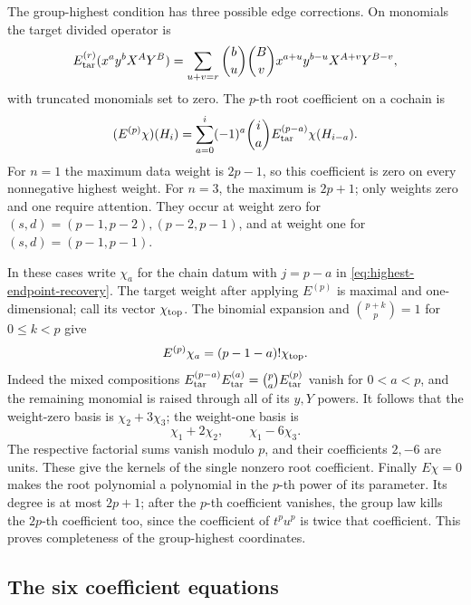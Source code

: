 \documentclass[11pt]{article}
\theoremstyle{plain}
\theoremstyle{definition}
\theoremstyle{remark}
\numberwithin{equation}{section}
\begin{document}
The group-highest condition has three possible edge corrections.
On monomials the target divided operator is
\[
 E_{\rm tar}^{(r)}(x^ay^bX^AY^B)
   =\sum_{u+v=r}\binom bu\binom Bv
        x^{a+u}y^{b-u}X^{A+v}Y^{B-v},
\]
with truncated monomials set to zero.
The \(p\)-th root coefficient on a cochain is
\[
 (E^{(p)}\chi)(H_i)=
    \sum_{a=0}^i(-1)^a\binom ia
              E_{\rm tar}^{(p-a)}\chi(H_{i-a}).
\]
For \(n=1\) the maximum data weight is \(2p-1\), so this
coefficient is zero on every nonnegative highest weight.
For \(n=3\), the maximum is \(2p+1\); only weights zero and one
require attention.
They occur at weight zero for
\((s,d)=(p-1,p-2),(p-2,p-1)\), and at weight one for
\((s,d)=(p-1,p-1)\).

In these cases write \(\chi_a\) for the chain datum with
\(j=p-a\) in \eqref{eq:highest-endpoint-recovery}.
The target weight after applying \(E^{(p)}\) is maximal and
one-dimensional; call its vector \(\chi_{\rm top}\).
The binomial expansion and
\(\binom{p+k}{p}=1\) for \(0\le k<p\) give
\[
 E^{(p)}\chi_a=(p-1-a)!\chi_{\rm top}.
\]
Indeed the mixed compositions
\(E_{\rm tar}^{(p-a)}E_{\rm tar}^{(a)}
 =\binom pa E_{\rm tar}^{(p)}\)
vanish for \(0<a<p\), and the remaining monomial is raised
through all of its \(y,Y\) powers.
It follows that the weight-zero basis is
\(\chi_2+3\chi_3\); the weight-one basis is
\[
 \chi_1+2\chi_2,\qquad \chi_1-6\chi_3.
\]
The respective factorial sums vanish modulo \(p\), and their
coefficients \(2,-6\) are units.
These give the kernels of the single nonzero root coefficient.
Finally \(E\chi=0\) makes the root polynomial a polynomial in
the \(p\)-th power of its parameter.
Its degree is at most \(2p+1\); after the \(p\)-th coefficient
vanishes, the group law kills the \(2p\)-th coefficient too,
since the coefficient of \(t^pu^p\) is twice that coefficient.
This proves completeness of the group-highest coordinates.


\subsection{The six coefficient equations}
\end{document}
